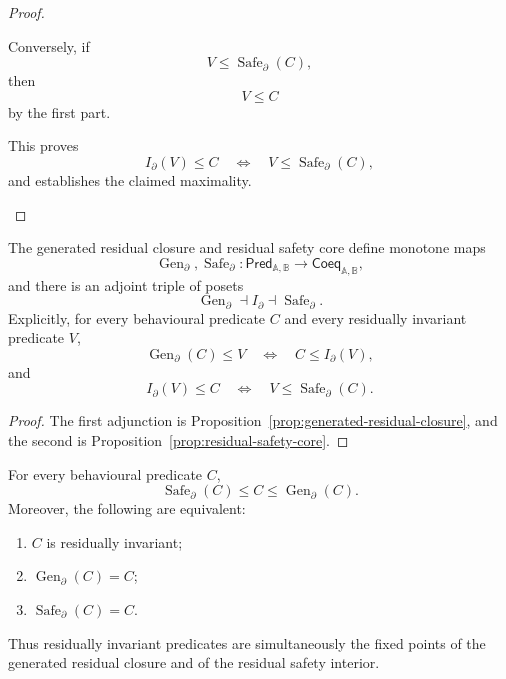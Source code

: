 \begin{proof}
\begin{enumerate}
        Conversely, if
        \[
            V\leq\operatorname{Safe}_\partial(C),
        \]
        then
        \[
            V\leq C
        \]
        by the first part.

        This proves
        \[
            I_\partial(V)\leq C
            \quad\Longleftrightarrow\quad
            V\leq\operatorname{Safe}_\partial(C),
        \]
        and establishes the claimed maximality.
    \end{enumerate}
\end{proof}

\begin{theorem}
\label{thm:generation-inclusion-safety-adjoint-triple}
    The generated residual closure and residual safety core define monotone
    maps
    \[
        \operatorname{Gen}_\partial,
        \operatorname{Safe}_\partial:
        \mathsf{Pred}_{\mathbb A,\mathbb B}
        \to
        \mathsf{Coeq}_{\mathbb A,\mathbb B},
    \]
    and there is an adjoint triple of posets
    \[
        \operatorname{Gen}_\partial
        \dashv
        I_\partial
        \dashv
        \operatorname{Safe}_\partial.
    \]
    Explicitly, for every behavioural predicate \(C\) and every residually
    invariant predicate \(V\),
    \[
        \operatorname{Gen}_\partial(C)\leq V
        \quad\Longleftrightarrow\quad
        C\leq I_\partial(V),
    \]
    and
    \[
        I_\partial(V)\leq C
        \quad\Longleftrightarrow\quad
        V\leq\operatorname{Safe}_\partial(C).
    \]
\end{theorem}

\begin{proof}
    The first adjunction is
    Proposition~\ref{prop:generated-residual-closure}, and the second is
    Proposition~\ref{prop:residual-safety-core}.
\end{proof}

\begin{corollary}
\label{cor:residual-closure-and-interior}
    For every behavioural predicate \(C\),
    \[
        \operatorname{Safe}_\partial(C)
        \leq
        C
        \leq
        \operatorname{Gen}_\partial(C).
    \]
    Moreover, the following are equivalent:
    \begin{enumerate}
        \item \(C\) is residually invariant;
        \item \(\operatorname{Gen}_\partial(C)=C\);
        \item \(\operatorname{Safe}_\partial(C)=C\).
    \end{enumerate}
    Thus residually invariant predicates are simultaneously the fixed points
    of the generated residual closure and of the residual safety interior.
\end{corollary}

